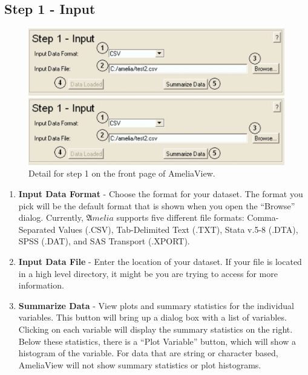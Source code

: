 \documentclass[12pt,titlepage]{article}
\begin{document}
\subsection{Step 1 - Input}
\label{sec:step1}
\begin{figure}[ht]
  \centering 
  \begin{htmlonly} 
    \includegraphics[scale=1]{step1} 
  \end{htmlonly}
  \begin{latexonly}
    \includegraphics[scale=.75]{step1}
  \end{latexonly}
  \caption{Detail for step 1 on the front page of AmeliaView.}
\end{figure}
\begin{enumerate}
\item \textbf{Input Data Format} - Choose the format for your dataset.
  The format you pick will be the default format that is shown when
  you open the ``Browse'' dialog.  Currently, ${\mathfrak Amelia}$
  supports five different file formats: Comma-Separated Values (.CSV),
  Tab-Delimited Text (.TXT), Stata v.5-8 (.DTA), SPSS (.DAT), and SAS
  Transport (.XPORT).
\item \textbf{Input Data File} - Enter the location of your dataset.
  If your file is located in a high level directory, it might be
  you are trying to access for more information.
\item \textbf{Summarize Data} - View plots and summary statistics for
  the individual variables.  This button will bring up a dialog box
  with a list of variables.  Clicking on each variable will display
  the summary statistics on the right.  Below these statistics, there
  is a ``Plot Variable'' button, which will show a histogram of the
  variable.  For data that are string or character based, AmeliaView
  will not show summary statistics or plot histograms.
\end{enumerate}
\end{document}
